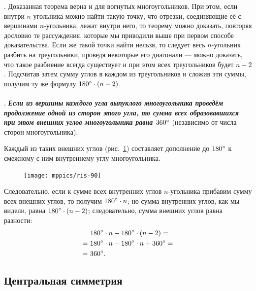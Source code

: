 \medskip



\smallskip
{}.
Доказанная теорема верна и для вогнутых многоугольников.
При этом, если внутри $n$-угольника можно найти такую точку, что отрезки, соединяющие её с вершинами $n$-угольника, лежат внутри него, то теорему можно доказать, повторяя дословно те рассуждения, которые мы приводили выше при первом способе доказательства.
Если же такой точки найти нельзя, то следует весь $n$-угольник разбить на треугольники, проведя некоторые его диагонали — можно доказать, что такое разбиение всегда существует и при этом всех треугольников будет $n-2$.
Подсчитав затем сумму углов в каждом из треугольников и сложив эти суммы, получим ту же формулу $180\degree\cdot(n - 2)$.



\paragraph{}\label{1938/83}
\mbox{.}
\textbf{\emph{Если из вершины каждого угла выпуклого многоугольника проведём продолжение одной из сторон этого угла, то сумма всех образовавшихся при этом внешних углов многоугольника равна $360\degree$}} (независимо от числа сторон многоугольника).

Каждый из таких внешних углов (рис.~\ref{1938/ris-90}) составляет дополнение до $180\degree$ к смежному с ним внутреннему углу многоугольника.

{

\begin{figure}
\centering
\texttt{[image: mppics/ris-90]}
\caption{}\label{1938/ris-90}
\end{figure}

Следовательно, если к сумме всех внутренних углов $n$-угольника прибавим сумму всех внешних углов, то получим $180\degree\cdot n$;
но сумма внутренних углов, как мы видели, равна $180\degree\cdot (n - 2)$;
следовательно, сумма внешних углов равна разности:
\begin{align*}
&180\degree\cdot n-180\degree\cdot (n - 2)=
\\
=~&180\degree\cdot n-180\degree\cdot n+360\degree=
\\
=~&360\degree.
\end{align*}

}

\subsection*{Центральная симметрия}

